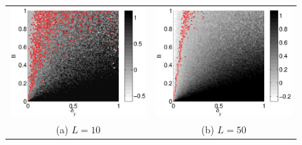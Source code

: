 \documentclass[a4paper,11pt,twocolumn]{article}
\begin{document}
\begin{figure}[ht]
\begin{tabular}{cc}
\includegraphics[scale=0.30]{SimpleIRexample_diffLpart1.eps} &
\includegraphics[scale=0.30]{SimpleIRexample_diffLpart2.eps} \\
(a) $L=10$ & (b) $L=50$ \\

\end{tabular}
\end{figure}
\end{document}
